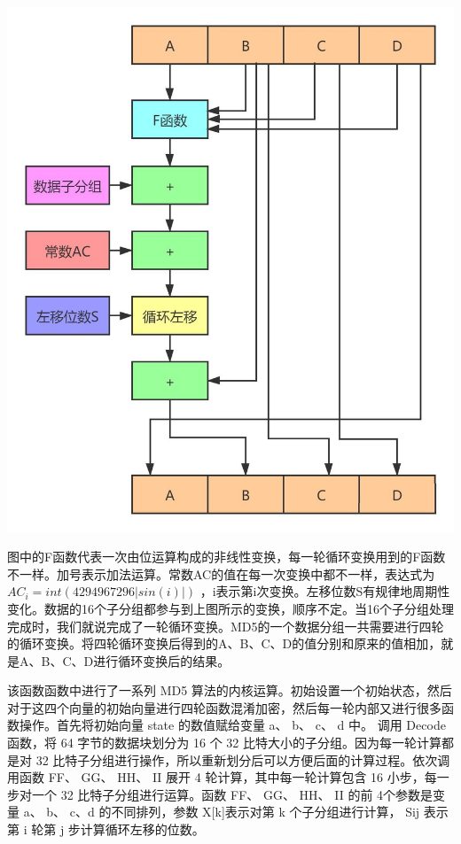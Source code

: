 \documentclass[UTF8,a4paper,10pt]{ctexart}
\begin{document}
\begin{itemize}
    \begin{center}
        \includegraphics*[scale = 0.2]{v2-66f0ecf6a1e2cde4e2db1908f054f5ae_1440w}
    \end{center}
    图中的F函数代表一次由位运算构成的非线性变换，每一轮循环变换用到的F函数不一样。加号表示加法运算。常数AC的值在每一次变换中都不一样，表达式为$AC_i = int(4294967296|sin(i)|)$ ，i表示第i次变换。左移位数S有规律地周期性变化。数据的16个子分组都参与到上图所示的变换，顺序不定。当16个子分组处理完成时，我们就说完成了一轮循环变换。MD5的一个数据分组一共需要进行四轮的循环变换。将四轮循环变换后得到的A、B、C、D的值分别和原来的值相加，就是A、B、C、D进行循环变换后的结果。

    该函数函数中进行了一系列 MD5 算法的内核运算。初始设置一个初始状态，然后对于这四个向量的初始向量进行四轮函数混淆加密，然后每一轮内部又进行很多函数操作。首先将初始向量 state 的数值赋给变量 a、 b、 c、 d 中。 调用 Decode 函数，将 64 字节的数据块划分为 16 个 32 比特大小的子分组。因为每一轮计算都是对 32 比特子分组进行操作，所以重新划分后可以方便后面的计算过程。依次调用函数 FF、 GG、 HH、 II 展开 4 轮计算，其中每一轮计算包含 16 小步，每一步对一个 32 比特子分组进行运算。函数 FF、 GG、 HH、 II 的前 4个参数是变量 a、 b、 c、d 的不同排列，参数 X[k]表示对第 k 个子分组进行计算， Sij 表示第 i 轮第 j 步计算循环左移的位数。
    

\end{itemize}
\end{document}
